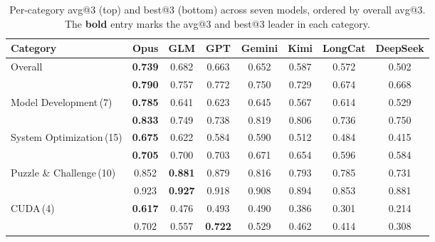 \begin{table}[t]
\centering
\footnotesize
\setlength{\tabcolsep}{4pt}
\caption{Per-category avg@3 (top) and best@3 (bottom) across seven models, ordered by overall avg@3. The \textbf{bold} entry marks the avg@3 and best@3 leader in each category.}
\label{tab:per_category}
\begin{tabular}{lccccccc}
\toprule
Category & Opus & GLM & GPT & Gemini & Kimi & LongCat & DeepSeek \\
\midrule
\multirow{2}{*}{Overall} & \textbf{0.739} & 0.682 & 0.663 & 0.652 & 0.587 & 0.572 & 0.502 \\
 & \textbf{0.790} & 0.757 & 0.772 & 0.750 & 0.729 & 0.674 & 0.668 \\
\midrule
\multirow{2}{*}{Model Development\,(7)} & \textbf{0.785} & 0.641 & 0.623 & 0.645 & 0.567 & 0.614 & 0.529 \\
 & \textbf{0.833} & 0.749 & 0.738 & 0.819 & 0.806 & 0.736 & 0.750 \\
\midrule
\multirow{2}{*}{System Optimization\,(15)} & \textbf{0.675} & 0.622 & 0.584 & 0.590 & 0.512 & 0.484 & 0.415 \\
 & \textbf{0.705} & 0.700 & 0.703 & 0.671 & 0.654 & 0.596 & 0.584 \\
\midrule
\multirow{2}{*}{Puzzle \& Challenge\,(10)} & 0.852 & \textbf{0.881} & 0.879 & 0.816 & 0.793 & 0.785 & 0.731 \\
 & 0.923 & \textbf{0.927} & 0.918 & 0.908 & 0.894 & 0.853 & 0.881 \\
\midrule
\multirow{2}{*}{CUDA\,(4)} & \textbf{0.617} & 0.476 & 0.493 & 0.490 & 0.386 & 0.301 & 0.214 \\
 & 0.702 & 0.557 & \textbf{0.722} & 0.529 & 0.462 & 0.414 & 0.308 \\
\bottomrule
\end{tabular}
\end{table}
